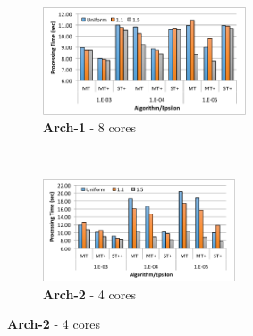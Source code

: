 \documentclass[runningheads]{llncs}
\begin{document}
\begin{figure}[htbp]
    \centering
    \begin{subfigure}[b]{0.47\textwidth}
        \centering
        \includegraphics[width = 6cm]{main_1_8.pdf}
        \caption{{\bf Arch-1} - 8 cores}
    \end{subfigure}\hspace*{1ex}
    ~
    \begin{subfigure}[b]{0.47\textwidth}
        \centering
        \includegraphics[width = 5.7cm]{main_2_4.pdf}
        \caption{{\bf Arch-2} - 4 cores}
    \end{subfigure}
    

\end{figure}
\end{document}
